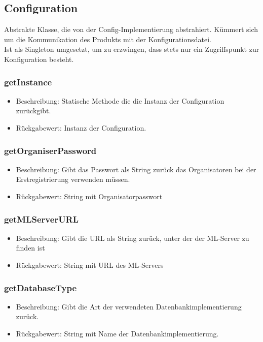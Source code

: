 \documentclass[a4paper]{scrreprt}
\begin{document}
	\subsection{Configuration}
	Abstrakte Klasse, die von der Config-Implementierung abstrahiert.
	Kümmert sich um die Kommunikation des Produkts mit der Konfigurationsdatei. \\
	Ist als Singleton umgesetzt, um zu erzwingen, dass stets nur ein Zugriffspunkt zur Konfiguration besteht.

	\subsubsection{getInstance}
	\begin{itemize}
		\item Beschreibung: Statische Methode die die Instanz der Configuration zurückgibt.
		\item Rückgabewert: Instanz der Configuration.
	\end{itemize}


	\subsubsection{getOrganiserPassword}
	\begin{itemize}
		\item Beschreibung: Gibt das Passwort als String zurück das Organisatoren bei der Erstregistrierung verwenden müssen.
		\item Rückgabewert: String mit Organisatorpasswort
	\end{itemize}

	\subsubsection{getMLServerURL}
	\begin{itemize}
		\item Beschreibung: Gibt die URL als String zurück, unter der der ML-Server zu finden ist
		\item Rückgabewert: String mit URL des ML-Servers
	\end{itemize}

	\subsubsection{getDatabaseType}
	\begin{itemize}
		\item Beschreibung: Gibt die Art der verwendeten Datenbankimplementierung zurück.
		\item Rückgabewert: String mit Name der Datenbankimplementierung.
	\end{itemize}
\end{document}
